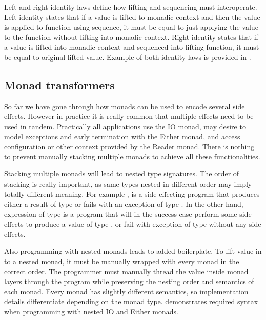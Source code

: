 

Left and right identity laws define how lifting and sequencing must interoperate. Left identity states that if a value is lifted to monadic context and then the value is applied to function using sequence, it must be equal to just applying the value to the function without lifting into monadic context. Right identity states that if a value is lifted into monadic context and sequenced into lifting function, it must be equal to original lifted value. Example of both identity laws is provided in .


\subsection{Monad transformers}\label{background:monad:monad-transformers}
So far we have gone through how monads can be used to encode several side effects. However in practice it is really common that multiple effects need to be used in tandem. Practically all applications use the IO monad, may desire to model exceptions and early termination with the Either monad, and access configuration or other context provided by the Reader monad. There is nothing to prevent manually stacking multiple monads to achieve all these functionalities.

Stacking multiple monads will lead to nested type signatures. The order of stacking is really important, as same types nested in different order may imply totally different meaning.  For example , is a side effecting program that produces either a result of type  or fails with an exception of type . In the other hand, expression of type  is a program that will in the success case perform some side effects to produce a value of type , or fail with exception of type  without any side effects.

Also programming with nested monads leads to added boilerplate. To lift value in to a nested monad, it must be manually wrapped with every monad in the correct order.
The programmer must manually thread the value inside monad layers through the program while preserving the nesting order and semantics of each monad. Every monad has slightly different semantics, so implementation details differentiate depending on the monad type.  demonstrates required syntax when programming with nested IO and Either monads.

